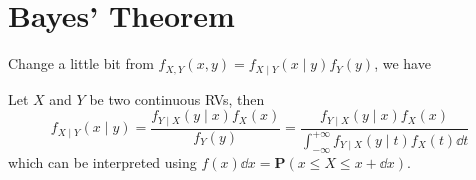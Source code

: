 \section{Bayes' Theorem}
Change a little bit from $f_{X, Y}(x, y) = f_{X \mid Y}(x \mid y) f_{Y}(y)$, we have
\begin{theorem}
    Let $X$ and $Y$ be two continuous RVs, then
    \begin{equation}
        f_{X \mid Y}(x \mid y) = \frac{f_{Y \mid X}(y \mid x) f_{X}(x)}{f_{Y}(y)} = \frac{f_{Y \mid X}(y \mid x) f_{X}(x)}{\int_{-\infty}^{+\infty} f_{Y \mid X}(y \mid t) f_{X}(t) \dd{t}}
    \end{equation}
    which can be interpreted using $f(x)\dd{x} = \mathbf{P}(x \leq X \leq x + \dd{x})$.
\end{theorem}
